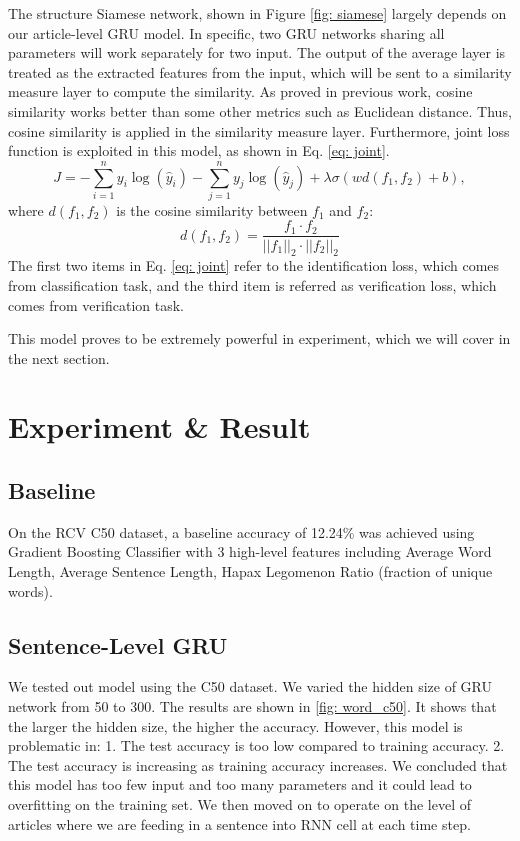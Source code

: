 \documentclass{article} %
\begin{document}
The structure Siamese network, shown in Figure \ref{fig: siamese} largely depends on our article-level GRU model. In specific, two GRU networks sharing all parameters will work separately for two input. The output of the average layer is treated as the extracted features from the input, which will be sent to a similarity measure layer to compute the similarity. As proved in previous work, cosine similarity works better than some other metrics such as Euclidean distance. Thus, cosine similarity is applied in the similarity measure layer. Furthermore, joint loss function is exploited in this model, as shown in Eq. \ref{eq: joint}.
%
\begin{equation}
\label{eq: joint}
J = -\sum\limits_{i = 1}^{n} y_i \log(\hat{y}_i)  -\sum\limits_{j = 1}^{n} y_j \log(\hat{y}_j) + \lambda \sigma(w d(f_1, f_2) + b),
\end{equation}
%
where $d(f_1, f_2)$ is the cosine similarity between $f_1$ and $f_2$:
\begin{equation}
d(f_1, f_2) = \frac{f_1 \cdot f_2}{||f_1||_2 \cdot ||f_2||_2 }
\end{equation}
%
The first two items in Eq. \ref{eq: joint} refer to the identification loss, which comes from classification task, and the third item is referred as verification loss, which comes from verification task. 


This model proves to be extremely powerful in experiment, which we will cover in the next section. 


\section{Experiment \& Result}



\subsection{Baseline}
On the RCV C50 dataset, a baseline accuracy of 12.24\% was achieved \cite{garbage} using Gradient Boosting Classifier with 3 high-level features including Average Word Length, Average Sentence Length, Hapax Legomenon Ratio (fraction of unique words).
%
\subsection{Sentence-Level GRU}
We tested out model using the C50 dataset. We varied the hidden size of GRU network from 50 to 300. The results are shown in \ref{fig: word_c50}. It shows that the larger the hidden size, the higher the accuracy. However, this model is problematic in: 1. The test accuracy is too low compared to training accuracy. 2. The test accuracy is increasing as training accuracy increases. We concluded that this model has too few input and too many parameters and it could lead to overfitting on the training set. We then moved on to operate on the level of articles where we are feeding in a sentence into RNN cell at each time step. 
\end{document}
